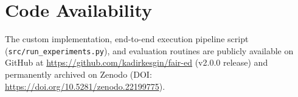\documentclass[11pt]{article}
\begin{document}
\section*{Code Availability}
The custom implementation, end-to-end execution pipeline script (\texttt{src/run\_experiments.py}), and evaluation routines are publicly available on GitHub at \url{https://github.com/kadirkesgin/fair-ed} (v2.0.0 release) and permanently archived on Zenodo (DOI: \url{https://doi.org/10.5281/zenodo.22199775}).



\end{document}
